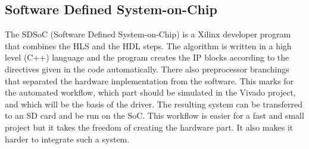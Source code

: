 \subsection{Software Defined System-on-Chip} %
The SDSoC (Software Defined System-on-Chip) is a Xilinx developer program that combines the HLS and the HDL steps.
The algorithm is written in a high level (C++) language and the program creates the IP blocks according to the directives given in the code automatically.
There also preprocessor branchings that separated the hardware implementation from the software.
This marks for the automated workflow, which part should be simulated in the Vivado project, and which will be the basis of the driver.
The resulting system can be transferred to an SD card and be run on the SoC.
This workflow is easier for a fast and small project but it takes the freedom of creating the hardware part.
It also makes it harder to integrate such a system.

\clearpage